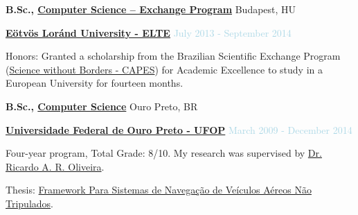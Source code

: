 \medskip

\textbf{B.Sc., 
        \href{https://www.elte.hu}
             {Computer Science -- Exchange Program}} \hfill Budapest, HU

\begin{outerlist}

\item[] \href{https://www.elte.hu}{\textbf{Eötvös Loránd University - ELTE}} \hfill {\textcolor{lightblue}{July 2013 - September 2014}} \medskip
        \begin{innerlist}[-]
        \item Honors: Granted a scholarship from the Brazilian Scientific Exchange Program (\href{http://capes.gov.br/images/stories/download/diversos/folder-SWB.pdf}{Science without Borders - CAPES}) for Academic Excellence to study in a European University for fourteen months.
        \end{innerlist}

\end{outerlist}

\textbf{B.Sc., 
        \href{https://ufop.br}
             {Computer Science}} \hfill Ouro Preto, BR

\begin{outerlist}

\item[] \href{https://ufop.br}{\textbf{Universidade Federal de Ouro Preto - UFOP}} \hfill {\textcolor{lightblue}{March 2009 - December 2014}} \medskip
        \begin{innerlist}[-]
        \item Four-year program, Total Grade: 8/10. My research was supervised by \href{http://buscatextual.cnpq.br/buscatextual/visualizacv.do?id=K4701865J6}{Dr. Ricardo A. R. Oliveira}.
        \item Thesis: \href{https://people.mpi-sws.org/~johnme/pdf/mono_johnnatan_messias-15.pdf}{Framework Para Sistemas de Navegação de Veículos Aéreos Não Tripulados}.
        \end{innerlist}

\end{outerlist}

